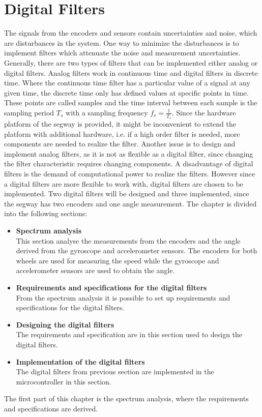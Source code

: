 \chapter{Digital Filters}

The signals from the encoders and sensors contain uncertainties and noise, which are disturbances in the system. One way to minimize the disturbances is to implement filters which attenuate the noise and measurement uncertainties. Generally, there are two types of filters that can be implemented either analog or digital filters. Analog filters work in continuous time and digital filters in discrete time. Where the continuous time filter has a particular value of a signal at any given time, the discrete time only has defined values at specific points in time. These points are called samples and the time interval between each sample is the sampling period $T_s$ with a sampling frequency $f_s = \frac{1}{T_s}$. Since the hardware platform of the segway is provided, it might be inconvenient to extend the platform with additional hardware, i.e. if a high order filter is needed, more components are needed to realize the filter. Another issue is to design and implement analog filters, as it is not as flexible as a digital filter, since changing the filter characteristic requires changing components. A disadvantage of digital filters is the demand of computational power to realize the filters. However since a digital filters are more flexible to work with, digital filters are chosen to be implemented. Two digital filters will be designed and three implemented, since the segway has two encoders and one angle measurement. The chapter is divided into the following sections:
\begin{itemize}
\item \textbf{Spectrum analysis}\\
This section analyse the measurements from the encoders and the angle derived from the gyroscope and accelerometer sensors. The encoders for both wheels are used for measuring the speed while the gyroscope and accelerometer sensors are used to obtain the angle.
\item \textbf{Requirements and specifications for the digital filters}\\
From the spectrum analysis it is possible to set up requirements and specifications for the digital filters.
\item \textbf{Designing the digital filters}\\
The requirements and specification are in this section used to design the digital filters.
\item \textbf{Implementation of the digital filters}\\
The digital filters from previous section are implemented in the microcontroller in this section.
\end{itemize}
The first part of this chapter is the spectrum analysis, where the requirements and specifications are derived.
